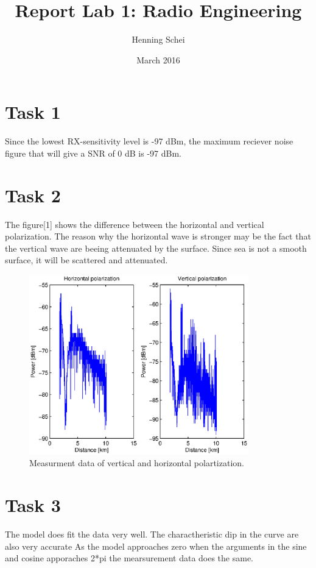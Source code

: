\documentclass{article}
\title{Report Lab 1: Radio Engineering}
\author{Henning Schei}
\date{March 2016}
\begin{document}
\maketitle

\section{Task 1}

Since the lowest RX-sensitivity level is -97 dBm, the maximum reciever noise figure that will give a SNR of 0 dB is -97 dBm. 


\section{Task 2}
The figure[1] shows the difference between the horizontal and vertical polarization. The reason why the horizontal wave is stronger may be the fact that the vertical wave are beeing attenuated by the surface. Since sea is not a smooth surface, it will be scattered and attenuated. 
\begin{figure}[H]
  \centering
      \includegraphics[width=0.85\textwidth]{task2.eps}
  \caption{Measurment data of vertical and horizontal polartization.}
\end{figure}
\section {Task 3}
The model does fit the data very well. The charactheristic dip in the curve are also very accurate
As the model approaches zero when the arguments in the sine and cosine apporaches 2*pi the mearsurement data does the same. 
\end{document}

